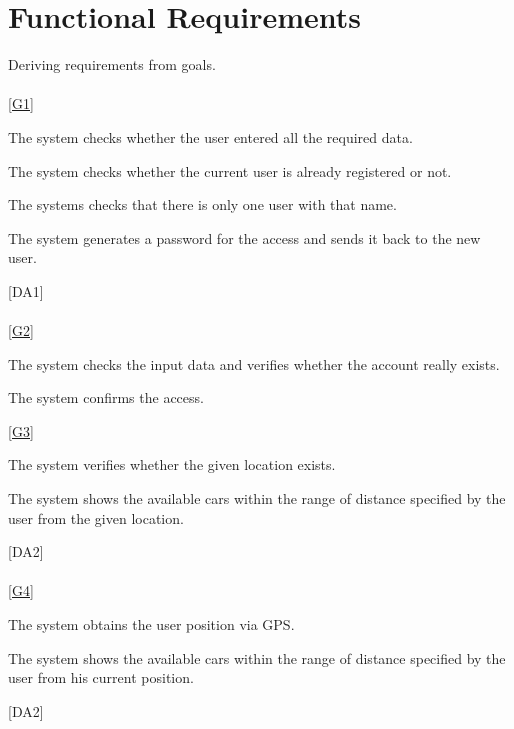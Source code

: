 \documentclass[11pt,a4paper]{report}
\begin{document}
\section{Functional Requirements}
Deriving requirements from goals.\\
\noindent \\
\noindent \ref{G1} \\
\begin{Req}
\item The system checks whether the user entered all the required data.
\item	The system checks whether the current user is already registered or not.
\item The systems checks that there is only one user with that name.
\item The system generates a password for the access and sends it back to the new user.
\end{Req}
\hspace{0.4cm}[DA1]\\
\noindent\\
\ref{G2} \\
\begin{Req}[resume]
\item The system checks the input data and verifies whether the account really exists.
\item The system confirms the access.
\end{Req}
\noindent
\ref{G3} \\
\begin{Req}[resume]
\item The system verifies whether the given location exists.
\item The system shows the available cars within the range of distance specified by the user from the given location.
\end{Req}
\hspace{0.4cm}[DA2] \\
\noindent\\
\ref{G4} \\
\begin{Req}[resume]
\item The system obtains the user position via GPS.
\item The system shows the available cars within the range of distance specified by the user from his current position.
\end{Req}
\hspace{0.4cm}[DA2] \\
\end{document}
